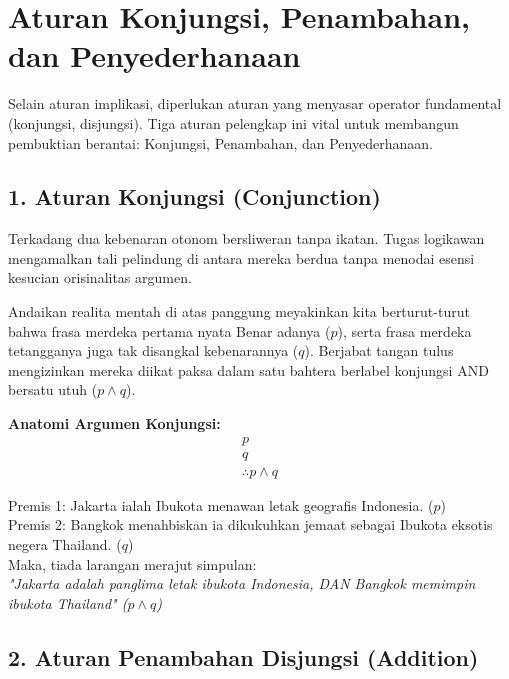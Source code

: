 \section{Aturan Konjungsi, Penambahan, dan Penyederhanaan}

Selain aturan implikasi, diperlukan aturan yang menyasar operator fundamental (konjungsi, disjungsi). Tiga aturan pelengkap ini vital untuk membangun pembuktian berantai: Konjungsi, Penambahan, dan Penyederhanaan.

\subsection{1. Aturan Konjungsi (Conjunction)}

Terkadang dua kebenaran otonom bersliweran tanpa ikatan. Tugas logikawan mengamalkan tali pelindung di antara mereka berdua tanpa menodai esensi kesucian orisinalitas argumen.

\begin{teorema}[Konjungsi]
Andaikan realita mentah di atas panggung meyakinkan kita berturut-turut bahwa frasa merdeka pertama nyata Benar adanya ($p$), serta frasa merdeka tetangganya juga tak disangkal kebenarannya ($q$). Berjabat tangan tulus mengizinkan mereka diikat paksa dalam satu bahtera berlabel konjungsi AND bersatu utuh ($p \land q$).
\end{teorema}

\textbf{Anatomi Argumen Konjungsi:}
\[
\begin{array}{c}
p \\
q \\
\hline
\therefore p \wedge q
\end{array}
\]

\begin{contoh}
Premis 1: Jakarta ialah Ibukota menawan letak geografis Indonesia. ($p$) \\
Premis 2: Bangkok menahbiskan ia dikukuhkan jemaat sebagai Ibukota eksotis negera Thailand. ($q$) \\
Maka, tiada larangan merajut simpulan: \\
\textit{"Jakarta adalah panglima letak ibukota Indonesia, DAN Bangkok memimpin ibukota Thailand" ($p \land q$)}
\end{contoh}

\subsection{2. Aturan Penambahan Disjungsi (Addition)}


